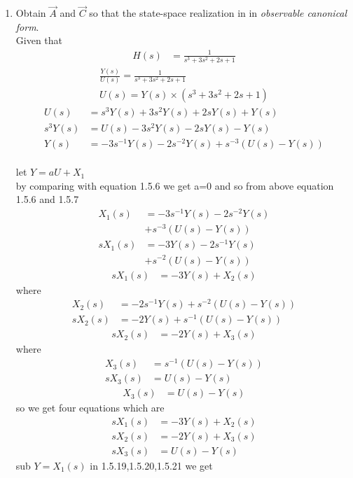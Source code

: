 \begin{enumerate}[label=\thesection.\arabic*.,ref=\thesection.\theenumi]
\item Obtain $\vec{A}$ and $\vec{C}$ so that the state-space realization in in {\em observable canonical form}.
\\
\solution  Given that
\begin{align}
H(s)&=\frac{1}{s^3+3s^2+2s+1}
\end{align}
\begin{align}
\frac{Y(s)}{U(s)}=\frac{1}{s^3+3s^2+2s+1} \\
 U(s)=Y(s) \times (s^3+3s^2+2s+1)
\end{align}
\begin{align}
U(s)&=s^3Y(s)+3s^2Y(s)+2sY(s)+Y(s)\\
s^3Y(s)&=U(s)-3s^2Y(s)-2sY(s)-Y(s)\\
Y(s)&=-3s^{-1}Y(s)-2s^{-2}Y(s)+s^{-3}(U(s)-Y(s))
\end{align}
\\ let $Y=aU+X_{1}$
\\ by comparing with equation 1.5.6 we get a=0 and
so from above equation 1.5.6 and 1.5.7
\begin{align*}
X_{1}(s)&=-3s^{-1}Y(s)-2s^{-2}Y(s)\\
&+s^{-3}(U(s)-Y(s))\\
sX_{1}(s)&=-3Y(s)-2s^{-1}Y(s)\\ 
&+s^{-2}(U(s)-Y(s))
\end{align*} 
\begin{align}
sX_{1}(s)&=-3Y(s)+X_{2}(s)
\end{align} 
where
\begin{align}
X_{2}(s)&=-2s^{-1}Y(s)+s^{-2}(U(s)-Y(s))\\
sX_{2}(s)&=-2Y(s)+s^{-1}(U(s)-Y(s))
\end{align} 
\begin{align}
sX_{2}(s)&=-2Y(s)+X_{3}(s)
\end{align}
where
\begin{align}
X_{3}(s)&=s^{-1}(U(s)-Y(s))\\
sX_{3}(s)&=U(s)-Y(s)
\end{align} 
\begin{align}
X_{3}(s)&=U(s)-Y(s)
\end{align}
so we get four equations which are
\begin{align}
sX_{1}(s)&=-3Y(s)+X_{2}(s)\\
sX_{2}(s)&=-2Y(s)+X_{3}(s)\\
sX_{3}(s)&=U(s)-Y(s)
\end{align} 
sub $ Y=X_{1}(s)$ in 1.5.19,1.5.20,1.5.21 we get
\begin{align}

\end{align}
\end{enumerate}
